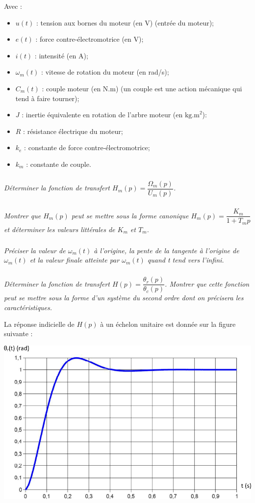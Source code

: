 \documentclass[10pt,fleqn]{article} %
\begin{document}
\begin{multicols}{2}
Avec : 
\begin{itemize}
\item $u(t)$ : tension aux bornes du moteur (en V) (entrée du moteur);
\item $e(t)$ : force contre-électromotrice (en V);
\item $i(t)$ : intensité (en A);
\item $\omega_m (t)$ : vitesse de rotation du moteur (en rad/s);
\item $C_m (t)$ : couple moteur (en N.m) (un couple est une action mécanique qui tend à faire tourner); 
\item $J$ : inertie équivalente en rotation de l’arbre moteur (en $\text{kg.m}^2$): 
\item $R$ : résistance électrique du moteur;
\item $k_e$ : constante de force contre-électromotrice;
\item $k_m$ : constante de couple.
\end{itemize}


\subparagraph{}\textit{Déterminer la fonction de transfert $H_m(p)=\dfrac{\Omega_m(p)}{U_m(p)}$.}

\subparagraph{}\textit{Montrer que $H_m(p)$ peut se mettre sous la forme canonique $H_m(p)=\dfrac{K_m}{1+T_m p}$ et déterminer les valeurs littérales de $K_m$ et $T_m$.}

\subparagraph{}\textit{Préciser la valeur de $\omega_m (t)$ à l'origine, la pente de la tangente à l'origine de $\omega_m (t)$ et la valeur finale atteinte par $\omega_m (t)$ quand t tend vers l’infini. }

\subparagraph{}\textit{Déterminer la fonction de transfert $H(p)=\dfrac{\theta_r(p)}{\theta_c(p)}$. Montrer que cette fonction peut se mettre sous la forme d'un système du second ordre dont on précisera les caractéristiques.}

  La réponse indicielle de $H(p)$ à un échelon unitaire est donnée sur la figure suivante : 
  
\begin{center}
\includegraphics[width=\linewidth]{images/fig_03}
\end{center}



\end{multicols}
\end{document}
